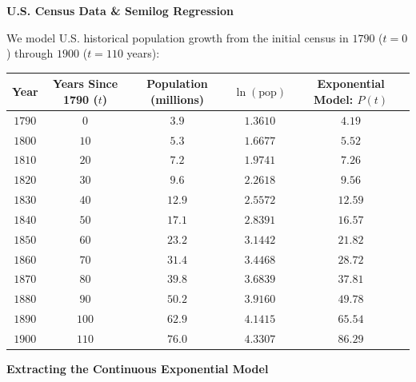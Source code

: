 \documentclass[10.5pt]{article}
\begin{document}
\vspace{0.03in}

\textbf{\large U.S. Census Data \& Semilog Regression}

We model U.S. historical population growth from the initial census in $1790$ ($t = 0$) through $1900$ ($t = 110$ years):

\begin{center}
\renewcommand{\arraystretch}{1.22}
\begin{tabular}{|c|c|c|c|c|}
\hline
\textbf{Year} & \textbf{Years Since 1790 ($t$)} & \textbf{Population (millions)} & \textbf{$\ln(\text{pop})$} & \textbf{Exponential Model: $P(t)$} \\ \hline
$1790$ & $0$ & $3.9$ & $1.3610$ & $4.19$ \\ \hline
$1800$ & $10$ & $5.3$ & $1.6677$ & $5.52$ \\ \hline
$1810$ & $20$ & $7.2$ & $1.9741$ & $7.26$ \\ \hline
$1820$ & $30$ & $9.6$ & $2.2618$ & $9.56$ \\ \hline
$1830$ & $40$ & $12.9$ & $2.5572$ & $12.59$ \\ \hline
$1840$ & $50$ & $17.1$ & $2.8391$ & $16.57$ \\ \hline
$1850$ & $60$ & $23.2$ & $3.1442$ & $21.82$ \\ \hline
$1860$ & $70$ & $31.4$ & $3.4468$ & $28.72$ \\ \hline
$1870$ & $80$ & $39.8$ & $3.6839$ & $37.81$ \\ \hline
$1880$ & $90$ & $50.2$ & $3.9160$ & $49.78$ \\ \hline
$1890$ & $100$ & $62.9$ & $4.1415$ & $65.54$ \\ \hline
$1900$ & $110$ & $76.0$ & $4.3307$ & $86.29$ \\ \hline
\end{tabular}
\end{center}

\vspace{0.03in}

\textbf{\large Extracting the Continuous Exponential Model}
\end{document}

